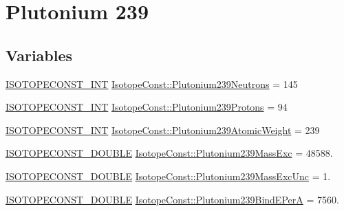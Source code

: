\hypertarget{group___isotope_const-_plutonium-_pu239}{}\section{Plutonium 239}
\label{group___isotope_const-_plutonium-_pu239}
\subsection*{Variables}
\begin{DoxyCompactItemize}
\item 
\mbox{\hyperlink{group___isotope_const-_macros_ga5f18360b3e99483a35c32d789e62621c}{I\+S\+O\+T\+O\+P\+E\+C\+O\+N\+S\+T\+\_\+\+I\+NT}} \mbox{\hyperlink{group___isotope_const-_plutonium-_pu239_gae4c7f60c05472b7bf0629c597766409d}{Isotope\+Const\+::\+Plutonium239\+Neutrons}} = 145
\item 
\mbox{\hyperlink{group___isotope_const-_macros_ga5f18360b3e99483a35c32d789e62621c}{I\+S\+O\+T\+O\+P\+E\+C\+O\+N\+S\+T\+\_\+\+I\+NT}} \mbox{\hyperlink{group___isotope_const-_plutonium-_pu239_ga57f4504667662a673f9f68843523f992}{Isotope\+Const\+::\+Plutonium239\+Protons}} = 94
\item 
\mbox{\hyperlink{group___isotope_const-_macros_ga5f18360b3e99483a35c32d789e62621c}{I\+S\+O\+T\+O\+P\+E\+C\+O\+N\+S\+T\+\_\+\+I\+NT}} \mbox{\hyperlink{group___isotope_const-_plutonium-_pu239_ga66cb8b80442320d299f03a06faa78eb6}{Isotope\+Const\+::\+Plutonium239\+Atomic\+Weight}} = 239
\item 
\mbox{\hyperlink{group___isotope_const-_macros_ga8f45a7272ce02c0b4c65c44636ed719a}{I\+S\+O\+T\+O\+P\+E\+C\+O\+N\+S\+T\+\_\+\+D\+O\+U\+B\+LE}} \mbox{\hyperlink{group___isotope_const-_plutonium-_pu239_gabd025c012c1503f8269395e7ca1b0d6a}{Isotope\+Const\+::\+Plutonium239\+Mass\+Exc}} = 48588.
\item 
\mbox{\hyperlink{group___isotope_const-_macros_ga8f45a7272ce02c0b4c65c44636ed719a}{I\+S\+O\+T\+O\+P\+E\+C\+O\+N\+S\+T\+\_\+\+D\+O\+U\+B\+LE}} \mbox{\hyperlink{group___isotope_const-_plutonium-_pu239_ga5b27b2ca868c35b4e366bbeff4273382}{Isotope\+Const\+::\+Plutonium239\+Mass\+Exc\+Unc}} = 1.
\item 
\mbox{\hyperlink{group___isotope_const-_macros_ga8f45a7272ce02c0b4c65c44636ed719a}{I\+S\+O\+T\+O\+P\+E\+C\+O\+N\+S\+T\+\_\+\+D\+O\+U\+B\+LE}} \mbox{\hyperlink{group___isotope_const-_plutonium-_pu239_gacdb03d668c6279fdbf5efa865edd16f6}{Isotope\+Const\+::\+Plutonium239\+Bind\+E\+PerA}} = 7560.
\item 

\end{DoxyCompactItemize}
